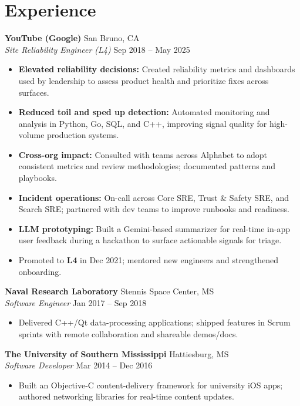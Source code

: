 \documentclass[10pt]{article}
\begin{document}
\section*{Experience}
\textbf{YouTube (Google)} \hfill San Bruno, CA \\
\textit{Site Reliability Engineer (L4)} \hfill Sep 2018 -- May 2025
\begin{itemize}
  \item \textbf{Elevated reliability decisions:} Created reliability metrics and dashboards used by leadership to assess product health and prioritize fixes across surfaces.
  \item \textbf{Reduced toil and sped up detection:} Automated monitoring and analysis in Python, Go, SQL, and C++, improving signal quality for high-volume production systems.
  \item \textbf{Cross-org impact:} Consulted with teams across Alphabet to adopt consistent metrics and review methodologies; documented patterns and playbooks.
  \item \textbf{Incident operations:} On-call across Core SRE, Trust \& Safety SRE, and Search SRE; partnered with dev teams to improve runbooks and readiness.
  \item \textbf{LLM prototyping:} Built a Gemini-based summarizer for real-time in-app user feedback during a hackathon to surface actionable signals for triage.
  \item Promoted to \textbf{L4} in Dec 2021; mentored new engineers and strengthened onboarding.
\end{itemize}

\textbf{Naval Research Laboratory} \hfill Stennis Space Center, MS \\
\textit{Software Engineer} \hfill Jan 2017 -- Sep 2018
\begin{itemize}
  \item Delivered C++/Qt data-processing applications; shipped features in Scrum sprints with remote collaboration and shareable demos/docs.
\end{itemize}

\textbf{The University of Southern Mississippi} \hfill Hattiesburg, MS \\
\textit{Software Developer} \hfill Mar 2014 -- Dec 2016
\begin{itemize}
  \item Built an Objective-C content-delivery framework for university iOS apps; authored networking libraries for real-time content updates.
\end{itemize}
\end{document}
